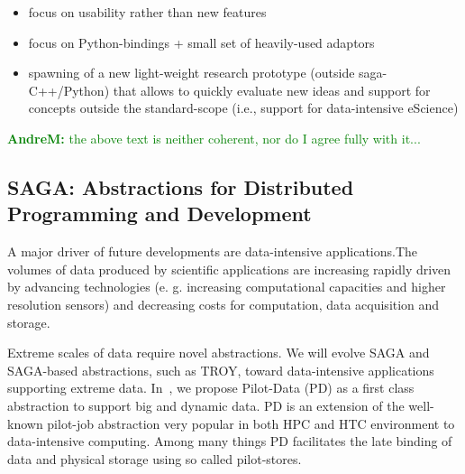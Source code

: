 \documentclass{article}
\newcommand{\B}[1]{\textbf{#1}}
\newcommand{\amnote}[1]{{\textcolor{green}{   \B{AndreM:  } #1 }}}
\newcommand{\hknote}[1]{{\textcolor{red}{  \B{Hartmut: } #1 }}}
\newcommand{\amnote}[1]{}
\newcommand{\hknote}[1]{}
\begin{document}
  \begin{itemize}
   \item focus on usability rather than new features
   \item focus on Python-bindings + small set of heavily-used adaptors
   \item spawning of a new light-weight research prototype (outside 
         saga-C++/Python) that allows to quickly evaluate new ideas 
         and support for concepts outside the standard-scope (i.e., 
         support for data-intensive eScience)
  \end{itemize}


  \amnote{the above text is neither coherent, nor do I agree fully with
  it...}


 \subsection{SAGA: Abstractions for Distributed Programming and
 Development}


A major driver of future developments are data-intensive applications.The
volumes of data produced by scientific applications are increasing
rapidly driven by advancing technologies (e. g. increasing computational
capacities and higher resolution sensors) and decreasing costs for
computation, data acquisition and storage.

Extreme scales of data require novel abstractions. We will evolve SAGA
and SAGA-based abstractions, such as TROY, toward data-intensive
applications supporting extreme data. In~\cite{troy-2011}, we propose
Pilot-Data (PD) as a first class abstraction to support big and dynamic
data. PD is an extension of the well-known pilot-job abstraction very
popular in both HPC and HTC environment to data-intensive computing.
Among many things PD facilitates the late binding of data and physical
storage using so called pilot-stores.
\end{document}
